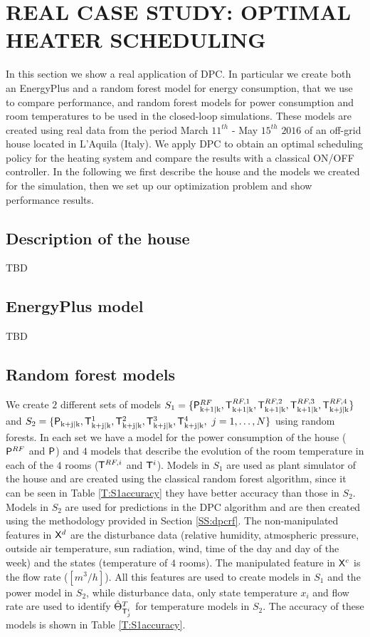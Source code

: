 \section{REAL CASE STUDY: OPTIMAL HEATER SCHEDULING} In this section we show a real application of DPC. In particular we create both an EnergyPlus and a random forest model for energy consumption, that we use to compare performance, and random forest models for power consumption and room temperatures to be used in the closed-loop simulations. These models are created using real data from the period March $11^{th}$ - May $15^{th}$ $2016$ of an off-grid house located in L'Aquila (Italy). We apply DPC to obtain an optimal scheduling policy for the heating system and compare the results with a classical ON/OFF controller. In the following we first describe the house and the models we created for the simulation, then we set up our optimization problem and show performance results.

\subsection{Description of the house} TBD

\subsection{EnergyPlus model} TBD

	\subsection{Random forest models} We create $2$ different sets of models $S_1 = \{\mathsf{P}^{RF}_{\mathrm{k+1|k}},\mathsf{T}^{RF,1}_{\mathrm{k+1|k}},\mathsf{T}^{RF,2}_{\mathrm{k+1|k}},\mathsf{T}^{RF,3}_{\mathrm{k+1|k}},\mathsf{T}^{RF,4}_{\mathrm{k+j|k}}\}$ and $S_2 = \{\tP_{\mathrm{k+j|k}},\tT^{1}_{\mathrm{k+j|k}},\tT^{2}_{\mathrm{k+j|k}},\tT^{3}_{\mathrm{k+j|k}},\tT^{4}_{\mathrm{k+j|k}},\ j = 1,\ldots,N\}$ using random forests. In each set we have a model for the power consumption of the house ($\mathsf{P}^{RF}$ and $\mathsf{P}$) and $4$ models that describe the evolution of the room temperature in each of the $4$ rooms ($\mathsf{T}^{RF,i}$ and $\mathsf{T}^i$). Models in $S_1$ are used as plant simulator of the house and are created using the classical random forest algorithm, since it can be seen in Table \ref{T:S1accuracy} they have better accuracy than those in $S_2$. Models in $S_2$ are used for predictions in the DPC algorithm and are then created using the methodology provided in Section \ref{SS:dpcrf}. The non-manipulated features in $\mathsf{X}^d$ are the disturbance data (relative humidity, atmospheric pressure, outside air temperature, sun radiation, wind, time of the day and day of the week) and the states (temperature of $4$ rooms). The manipulated feature in $\mathsf{X}^c$ is the flow rate ($[m^3/h]$). All this features are used to create models in $S_1$ and the power model in $S_2$, while disturbance data, only state temperature $x_i$ and flow rate are used to identify $\hat{\Theta}^{T}_{\mathsf{T}^i_j}$ for temperature models in $S_2$. The accuracy of these models is shown in Table \ref{T:S1accuracy}.

